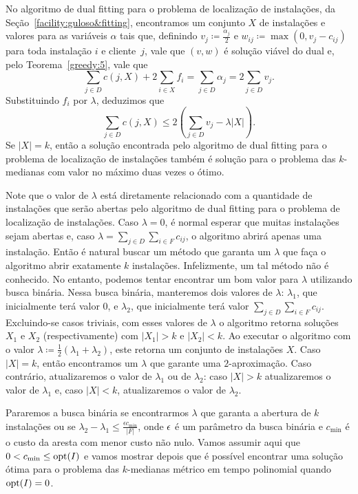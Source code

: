 No algoritmo de dual fitting para o problema de localização de instalações, da Seção~\ref{facility:guloso&fitting}, encontramos um conjunto $X$ de instalações e valores para as variáveis $\alpha$ tais que, definindo $v_j \coloneqq \frac{\alpha_j}{2}$ e $w_{ij} \coloneqq \max(0,v_j - c_{ij})$ para toda instalação $i$ e cliente~$j$, vale que $(v, w)$ é solução viável do dual e, pelo Teorema~\ref{greedy:5}, vale que
\[\sum_{j \in D} c(j,X) + 2\sum_{i \in X} f_i = \sum_{j \in D} \alpha_j =  2\sum_{j\in D} v_j.\]
Substituindo $f_i$ por $\lambda$, deduzimos que
\[\sum_{j\in D} c(j,X) \leq 2\left(\sum_{j\in D}v_j - \lambda|X|\right).\]
Se $|X| = k$, então a solução encontrada pelo algoritmo de dual fitting para o problema de localização de instalações também é solução para o problema das $k$-medianas com valor no máximo duas vezes o ótimo. 

Note que o valor de $\lambda$ está diretamente relacionado com a quantidade de instalações que serão abertas pelo algoritmo de dual fitting para o problema de localização de instalações. 
Caso $\lambda = 0$, é normal esperar que muitas instalações sejam abertas e, caso $\lambda = \sum_{j \in D}\sum_{i \in F}c_{ij}$, o algoritmo abrirá apenas uma instalação. 
Então é natural buscar um método que garanta um $\lambda$ que faça o algoritmo abrir exatamente $k$ instalações. 
Infelizmente, um tal método não é conhecido. 
No entanto, podemos tentar encontrar um bom valor para $\lambda$ utilizando busca binária. 
Nessa busca binária, manteremos dois valores de $\lambda$:  $\lambda_1$, que inicialmente terá valor 0, e $\lambda_2$, que inicialmente terá valor $\sum_{j \in D}\sum_{i \in F}c_{ij}$. 
Excluindo-se casos triviais, com esses valores de $\lambda$ o algoritmo retorna soluções $X_1$ e $X_2$ (respectivamente) com $|X_1| > k$ e $|X_2| < k$. 
Ao executar o algoritmo com o valor $\lambda \coloneqq \frac{1}{2}\left(\lambda_1 + \lambda_2 \right)$, este retorna um conjunto de instalações $X$. 
Caso $|X| = k$, então encontramos um $\lambda$ que garante uma $2$-aproximação. 
Caso contrário, atualizaremos o valor de $\lambda_1$ ou de $\lambda_2$: caso $|X| > k$ atualizaremos o valor de $\lambda_1$ e, caso $|X| < k$, atualizaremos o valor de $\lambda_2$. 

Pararemos a busca binária se encontrarmos $\lambda$ que garanta a abertura de $k$ instalações ou se $\lambda_2 - \lambda_1 \leq \frac{\epsilon c_{\min}}{|F|}$, onde $\epsilon$ é um parâmetro da busca binária e $c_\text{min}$ é o custo da aresta com menor custo não nulo. Vamos assumir aqui que $0 < c_{\min} \leq \mathrm{opt}(I)$ e vamos mostrar depois que é possível encontrar uma solução ótima para o problema das $k$-medianas métrico em tempo polinomial quando $\mathrm{opt}(I)=0$. 

